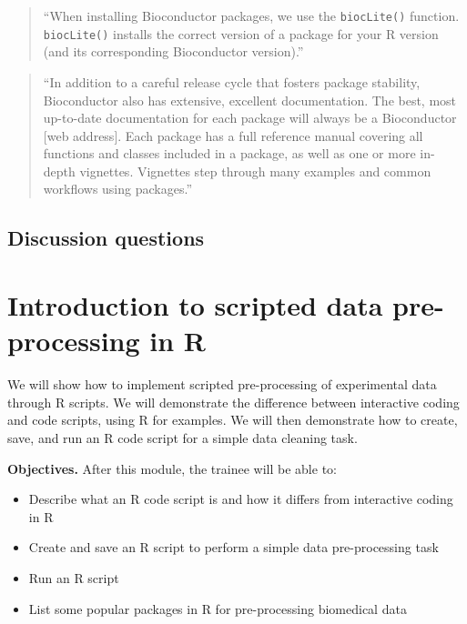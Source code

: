 \documentclass[]{tufte-book}
\providecommand{\tightlist}{%
  \setlength{\itemsep}{0pt}\setlength{\parskip}{0pt}}
\begin{document}
\begin{quote}
``When installing Bioconductor packages, we use the \texttt{biocLite()} function. \texttt{biocLite()}
installs the correct version of a package for your R version (and its corresponding
Bioconductor version).'' \citep{buffalo2015bioinformatics}
\end{quote}

\begin{quote}
``In addition to a careful release cycle that fosters package stability, Bioconductor
also has extensive, excellent documentation. The best, most up-to-date documentation
for each package will always be a Bioconductor {[}web address{]}. Each package has a full
reference manual covering all functions and classes included in a package,
as well as one or more in-depth vignettes. Vignettes step through many examples and
common workflows using packages.'' \citep{buffalo2015bioinformatics}
\end{quote}

\hypertarget{discussion-questions}{%
\subsection{Discussion questions}\label{discussion-questions}}

\hypertarget{introduction-to-scripted-data-pre-processing-in-r}{%
\section{Introduction to scripted data pre-processing in R}\label{introduction-to-scripted-data-pre-processing-in-r}}

We will show how to implement scripted pre-processing of experimental data
through R scripts. We will demonstrate the difference between interactive coding
and code scripts, using R for examples. We will then demonstrate how to create,
save, and run an R code script for a simple data cleaning task.

\textbf{Objectives.} After this module, the trainee will be able to:

\begin{itemize}
\tightlist
\item
  Describe what an R code script is and how it differs from interactive
  coding in R
\item
  Create and save an R script to perform a simple data pre-processing task
\item
  Run an R script
\item
  List some popular packages in R for pre-processing biomedical data
\end{itemize}
\end{document}
